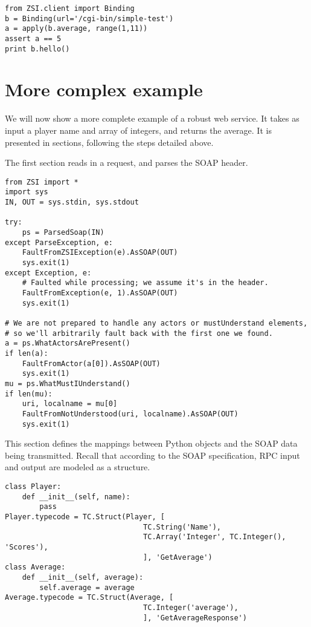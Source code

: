 \begin{verbatim}
from ZSI.client import Binding
b = Binding(url='/cgi-bin/simple-test')
a = apply(b.average, range(1,11))
assert a == 5
print b.hello()
\end{verbatim}

\section{More complex example}

We will now show a more complete example of a robust web service.
It takes as input a player name and array of integers, and returns
the average.
It is presented in sections, following the steps detailed above.

The first section reads in a request, and parses the SOAP header.

\begin{verbatim}
from ZSI import *
import sys
IN, OUT = sys.stdin, sys.stdout

try:
    ps = ParsedSoap(IN)
except ParseException, e:
    FaultFromZSIException(e).AsSOAP(OUT)
    sys.exit(1)
except Exception, e:
    # Faulted while processing; we assume it's in the header.
    FaultFromException(e, 1).AsSOAP(OUT)
    sys.exit(1)

# We are not prepared to handle any actors or mustUnderstand elements,
# so we'll arbitrarily fault back with the first one we found.
a = ps.WhatActorsArePresent()
if len(a):
    FaultFromActor(a[0]).AsSOAP(OUT)
    sys.exit(1)
mu = ps.WhatMustIUnderstand()
if len(mu):
    uri, localname = mu[0]
    FaultFromNotUnderstood(uri, localname).AsSOAP(OUT)
    sys.exit(1)
\end{verbatim}

This section defines the mappings between Python objects and the SOAP
data being transmitted.
Recall that according to the SOAP specification, RPC input and output
are modeled as a structure.

\begin{verbatim}
class Player:
    def __init__(self, name):
        pass
Player.typecode = TC.Struct(Player, [
                                TC.String('Name'),
                                TC.Array('Integer', TC.Integer(), 'Scores'),
                                ], 'GetAverage')
class Average:
    def __init__(self, average):
        self.average = average
Average.typecode = TC.Struct(Average, [
                                TC.Integer('average'),
                                ], 'GetAverageResponse')
\end{verbatim}

